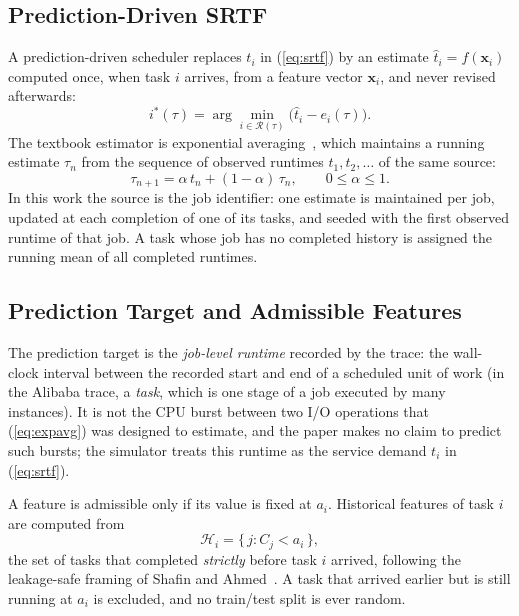 \documentclass[conference]{IEEEtran}
\begin{document}
\subsection{Prediction-Driven SRTF}
A prediction-driven scheduler replaces $t_i$ in (\ref{eq:srtf}) by an
estimate $\hat{t}_i = f(\mathbf{x}_i)$ computed once, when task $i$ arrives,
from a feature vector $\mathbf{x}_i$, and never revised afterwards:
\begin{equation}
  i^{*}(\tau) = \arg\min_{i \in \mathcal{R}(\tau)} \bigl( \hat{t}_i - e_i(\tau) \bigr).
  \label{eq:srtf-pred}
\end{equation}
The textbook estimator is exponential
averaging~\cite{silberschatz_os_2018}, which maintains a running estimate $\tau_n$ from the sequence of
observed runtimes $t_1, t_2, \ldots$ of the same source:
\begin{equation}
  \tau_{n+1} = \alpha\, t_n + (1 - \alpha)\, \tau_n, \qquad 0 \le \alpha \le 1 .
  \label{eq:expavg}
\end{equation}
In this work the source is the job identifier: one estimate is maintained per
job, updated at each completion of one of its tasks, and seeded with the
first observed runtime of that job. A task whose job has no completed history
is assigned the running mean of all completed runtimes.

\subsection{Prediction Target and Admissible Features}
The prediction target is the \emph{job-level runtime} recorded by the trace:
the wall-clock interval between the recorded start and end of a scheduled unit
of work (in the Alibaba trace, a \emph{task}, which is one stage of a job
executed by many instances). It is not the CPU burst between two I/O
operations that (\ref{eq:expavg}) was designed to estimate, and the paper
makes no claim to predict such bursts; the simulator treats this runtime as
the service demand $t_i$ in (\ref{eq:srtf}).

A feature is admissible only if its value is fixed at $a_i$. Historical
features of task $i$ are computed from
\begin{equation}
  \mathcal{H}_i = \{\, j : C_j < a_i \,\},
  \label{eq:causal}
\end{equation}
the set of tasks that completed \emph{strictly} before task $i$ arrived,
following the leakage-safe framing of Shafin and
Ahmed~\cite{shafin_leakage_2026}. A task that arrived earlier but is still
running at $a_i$ is excluded, and no train/test split is ever random.
\end{document}
